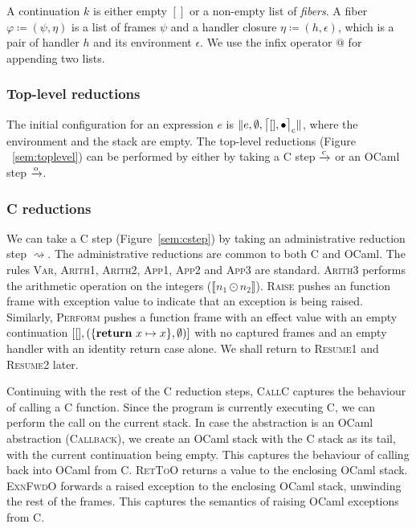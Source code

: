 \documentclass[sigplan,screen]{acmart}
\newcommand{\env}{\epsilon}
\newcommand{\kw}[1]{\text{\bf #1}}
\newcommand{\caseval}[2]{\kw{return}~#1 \mapsto #2}
\newcommand{\fiber}{\varphi}
\newcommand{\fl}{\psi} %
\newcommand{\hc}{\eta} %
\newcommand{\cstacka}[2]{\big \lceil #1, #2 \big \rceil_{\text c}} %
\newcommand{\configa}[3]{\|#1,#2,#3\|}
\newcommand{\ostep}{\xrightarrow{\text o}}
\newcommand{\cstep}{\xrightarrow{\text c}}
\begin{document}
A continuation $k$ is either empty $[]$ or a non-empty list of \emph{fibers}. A
fiber $\fiber \coloneqq (\fl,\hc)$ is a list of frames $\fl$ and a handler
closure $\hc \coloneqq (h,\env)$, which is a pair of handler $h$ and its
environment $\env$. We use the infix operator $@$ for appending two lists.

\subsubsection{Top-level reductions}

The initial configuration for an expression $e$ is
$\configa{e}{\emptyset}{\cstacka{[]}{\bullet}}$, where the environment and the
stack are empty. The top-level reductions (Figure ~\ref{sem:toplevel}) can be
performed by either by taking a C step $\cstep$ or an OCaml step $\ostep$.

\subsubsection{C reductions}

We can take a C step (Figure~\ref{sem:cstep}) by taking an administrative
reduction step $\rightsquigarrow$. The administrative reductions are common to
both C and OCaml. The rules \textsc{Var}, \textsc{Arith1}, \textsc{Arith2},
\textsc{App1}, \textsc{App2} and \textsc{App3} are standard. \textsc{Arith3}
performs the arithmetic operation on the integers ($\llbracket n_1 \odot n_2
\rrbracket$). \textsc{Raise} pushes an function frame with exception value to
indicate that an exception is being raised. Similarly, \textsc{Perform} pushes
a function frame with an effect value with an empty continuation
$[[],(\{\caseval{x}{x}\},\emptyset)]$ with no captured frames and an empty
handler with an identity return case alone. We shall return to \textsc{Resume1}
and \textsc{Resume2} later.

Continuing with the rest of the C reduction steps, \textsc{CallC} captures the
behaviour of calling a C function. Since the program is currently executing C,
we can perform the call on the current stack. In case the abstraction is an
OCaml abstraction (\textsc{Callback}), we create an OCaml stack with the C
stack as its tail, with the current continuation being empty. This captures the
behaviour of calling back into OCaml from C. \textsc{RetToO} returns a value to
the enclosing OCaml stack. \textsc{ExnFwdO} forwards a raised exception to the
enclosing OCaml stack, unwinding the rest of the frames. This captures the
semantics of raising OCaml exceptions from C.
\end{document}

